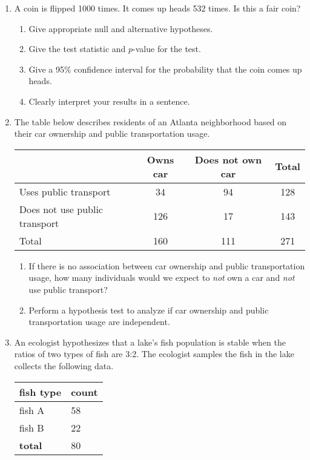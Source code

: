 \documentclass[12pt,fullpage]{amsart}
\begin{document}
\begin{enumerate}
\vfill


\item A coin is flipped 1000 times. It comes up heads 532 times. Is this a fair coin?
  \begin{enumerate}
  \item Give appropriate null and alternative hypotheses.
  \item Give the test statistic and $p$-value for the test.
\item Give a 95\% confidence interval for the probability that the coin comes up heads.
  \item Clearly interpret your results in a sentence.
  \end{enumerate}

  \vfill
  
\item
The table below describes residents of an Atlanta neighborhood based on their car ownership and public transportation usage. 
\begin{center}
\begin{tabular}{|l|cc|c|}
    \hline
                    & Owns car & Does not own car & Total \\
    \hline
    Uses public transport             & 34 & 94 & 128\\
    Does not use public transport     & 126 & 17 & 143\\
    \hline
    Total                             & 160 & 111 & 271\\
    \hline
\end{tabular}
\end{center}
\begin{enumerate}
\item  If there is no association between car ownership and public transportation usage, how many individuals would we expect to \emph{not} own a car and \emph{not} use public transport?
\item Perform a hypothesis test to analyze if car ownership and public transportation usage are independent.
\end{enumerate}

\vfill


\item An ecologist hypothesizes that a lake's fish population is stable when the ratios of two types of fish are 3:2. The ecologist samples the fish in the lake collects the following data.

\begin{center}
\begin{tabular}{ll}
\textbf{fish type} & \textbf{count}\\
\hline
fish A & 58\\
fish B & 22\\
\hline
\textbf{total} & 80
\end{tabular}
\end{center}


\end{enumerate}
\end{document}
